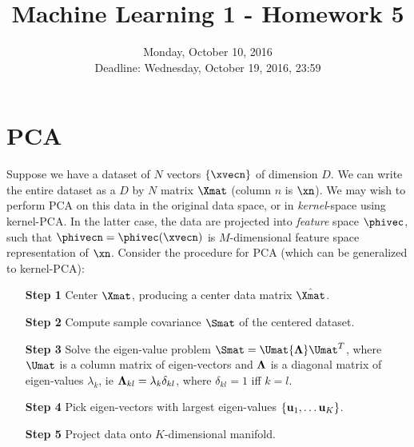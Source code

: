 \documentclass[12pt,a4paper]{article}
\title{Machine Learning 1 - Homework 5}
\author{Monday, October 10, 2016 \\ Deadline: Wednesday, October 19, 2016, 23:59}
\date{}
\newcommand{\VV}{{\bf \Lambda}}
\newcommand{\uu}{{\bf u}}
\newcommand{\vv}{\lambda}
\begin{document}
\maketitle
{}
\titleformat{\subsection}[runin]{\normalsize\bfseries}{}{0pt}{#1 \thesubsection\newline}



\section{PCA} 
Suppose we have a dataset of $N$ vectors $\{\xvecn\}$ of dimension $D$.  We can write the entire dataset as a $D$ by $N$ matrix $\Xmat$ (column $n$ is $\xn$). We may wish to perform PCA on this data in the original data space, or in {\em kernel}-space using kernel-PCA.  In the latter case, the data are projected into {\em feature} space $\phivec$, such that $\phivecn = \phivec(\xvecn)$ is $M$-dimensional feature space representation of $\xn$.  Consider the procedure for PCA (which can be generalized to kernel-PCA):
\begin{itemize}
	\item[{\bf Step 1}] Center $\Xmat$, producing a center data matrix $\hat{\Xmat}$. 
	\item[{\bf Step 2}] Compute sample covariance $\Smat$ of the centered dataset. 
	\item[{\bf Step 3}] Solve the eigen-value problem $\Smat = \Umat\VV\Umat^T$, where $\Umat$ is a column matrix of eigen-vectors and $\VV$ is a diagonal matrix of eigen-values $\lambda_k$, ie $\VV_{kl} = \vv_k \delta_{kl}$, where $\delta_{kl}=1$ iff $k=l$.
	\item[{\bf Step 4}] Pick eigen-vectors with largest eigen-values $\{\uu_1, \ldots \uu_K\}$.
	\item[{\bf Step 5}] Project data onto $K$-dimensional manifold.
\end{itemize}
\end{document}
